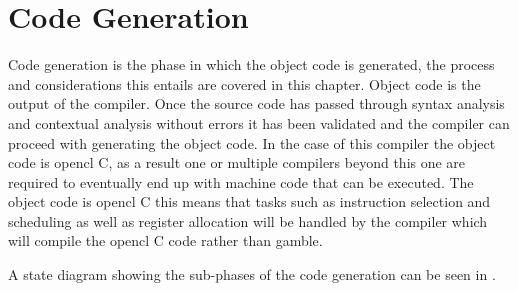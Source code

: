 \chapter{Code Generation}
Code generation is the phase in which the object code is generated, the process and considerations this entails are covered in this chapter.
Object code is the output of the compiler.
Once the source code has passed through syntax analysis and contextual analysis without errors it has been validated and the compiler can proceed with generating the object code.
In the case of this compiler the object code is \gls{opencl} C, as a result one or multiple compilers beyond this one are required to eventually end up with machine code that can be executed.
The object code is \gls{opencl} C this means that tasks such as instruction selection and scheduling as well as register allocation will be handled by the compiler which will compile the \gls{opencl} C code rather than \gls{gamble}.

A state diagram showing the sub-phases of the code generation can be seen in .


